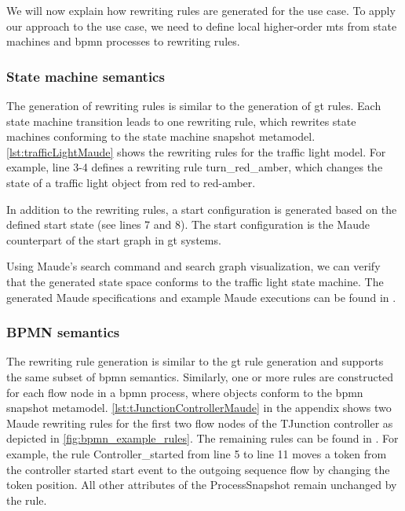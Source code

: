 \documentclass{jot}
\begin{document}
We will now explain how rewriting rules are generated for the use case.
To apply our approach to the use case, we need to define local higher-order \gls*{mt}s from state machines and \gls*{bpmn} processes to rewriting rules.


\subsubsection{State machine semantics}
The generation of rewriting rules is similar to the generation of \gls*{gt} rules.
Each state machine transition leads to one rewriting rule, which rewrites state machines conforming to the state machine snapshot metamodel.
\autoref{lst:trafficLightMaude} shows the rewriting rules for the traffic light model.
For example, line 3-4 defines a rewriting rule \textsf{turn\_red\_amber}, which changes the state of a traffic light object from red to red-amber.

In addition to the rewriting rules, a start configuration is generated based on the defined start state (see lines 7 and 8).
The start configuration is the Maude counterpart of the start graph in \gls*{gt} systems.



Using Maude's search command and search graph visualization, we can verify that the generated state space conforms to the traffic light state machine.
The generated Maude specifications and example Maude executions can be found in \cite{krauterArtifactsBehavioralConsistency2022}.

\subsubsection{BPMN semantics}
The rewriting rule generation is similar to the \gls*{gt} rule generation and supports the same subset of \gls*{bpmn} semantics.
Similarly, one or more rules are constructed for each flow node in a \gls*{bpmn} process, where objects conform to the \gls*{bpmn} snapshot metamodel.
\autoref{lst:tJunctionControllerMaude} in the appendix shows two Maude rewriting rules for the first two flow nodes of the TJunction controller as depicted in \cref{fig:bpmn_example_rules}.
The remaining rules can be found in \cite{krauterArtifactsBehavioralConsistency2022}.
For example, the rule \textsf{Controller\_started} from line 5 to line 11 moves a token from the controller started start event to the outgoing sequence flow by changing the token position.
All other attributes of the \textsf{ProcessSnapshot} remain unchanged by the rule.
\end{document}

